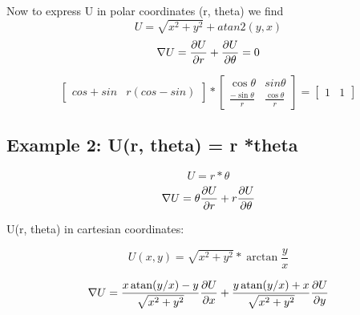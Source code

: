 \documentclass{article}
\begin{document}
Now to express U in polar coordinates (r, theta) we find
\[ U = \sqrt{x^2 + y^2} + atan2(y, x)  \]
\[\nabla U = \pdv{U}{r} + \pdv{U}{\theta} = 0  \]

\begin{equation}
\begin{bmatrix}
cos + sin & r(cos-sin)
\end{bmatrix}
*
\begin{bmatrix}
\cos\theta & sin\theta  \\
\frac{-\sin\theta}{r} &  \frac{\cos\theta}{r}
\end{bmatrix}
=
\begin{bmatrix}
1 & 1
\end{bmatrix}
\end{equation}

\subsection{Example 2: U(r, theta) = r *theta}

\[U = r * \theta\]
\[\nabla U = \theta \pdv{U}{r}+ r \pdv{U}{\theta} \]

U(r, theta) in cartesian coordinates:

\[ U(x, y) =\sqrt{x^2 +y^2}
*
\arctan\frac{y}{x} \]

\begin{equation}
\nabla U =
\frac{x \atan(y/x) - y}{\sqrt{x^2 + y^2}}
\pdv{U}{x} 
+
\frac{y \atan(y/x) + x}{\sqrt{x^2 + y^2}}
\pdv{U}{y} 
\end{equation}
\end{document}
